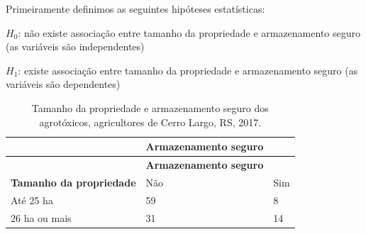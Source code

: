\documentclass[12pt,brazil,oneside]{book}
\begin{document}
Primeiramente definimos as seguintes hipóteses estatísticas:

\(H_0\): não existe associação entre tamanho da propriedade e armazenamento seguro (as variáveis são independentes)

\(H_1\): existe associação entre tamanho da propriedade e armazenamento seguro (as variáveis são dependentes)

\begin{longtable}[]{@{}lll@{}}
\caption{\label{tab:tamprop}Tamanho da propriedade e armazenamento seguro dos agrotóxicos, agricultores de Cerro Largo, RS, 2017.}\tabularnewline
\toprule
\begin{minipage}[b]{0.35\columnwidth}\raggedright
\strut
\end{minipage} & \begin{minipage}[b]{0.32\columnwidth}\raggedright
\textbf{Armazenamento seguro}\strut
\end{minipage} & \begin{minipage}[b]{0.16\columnwidth}\raggedright
\strut
\end{minipage}\tabularnewline
\midrule
\endfirsthead
\toprule
\begin{minipage}[b]{0.35\columnwidth}\raggedright
\strut
\end{minipage} & \begin{minipage}[b]{0.32\columnwidth}\raggedright
\textbf{Armazenamento seguro}\strut
\end{minipage} & \begin{minipage}[b]{0.16\columnwidth}\raggedright
\strut
\end{minipage}\tabularnewline
\midrule
\endhead
\begin{minipage}[t]{0.35\columnwidth}\raggedright
\textbf{Tamanho da propriedade}\strut
\end{minipage} & \begin{minipage}[t]{0.32\columnwidth}\raggedright
Não\strut
\end{minipage} & \begin{minipage}[t]{0.16\columnwidth}\raggedright
Sim\strut
\end{minipage}\tabularnewline
\begin{minipage}[t]{0.35\columnwidth}\raggedright
Até 25 ha\strut
\end{minipage} & \begin{minipage}[t]{0.32\columnwidth}\raggedright
59\strut
\end{minipage} & \begin{minipage}[t]{0.16\columnwidth}\raggedright
8\strut
\end{minipage}\tabularnewline
\begin{minipage}[t]{0.35\columnwidth}\raggedright
26 ha ou mais\strut
\end{minipage} & \begin{minipage}[t]{0.32\columnwidth}\raggedright
31\strut
\end{minipage} & \begin{minipage}[t]{0.16\columnwidth}\raggedright
14\strut
\end{minipage}\tabularnewline
\bottomrule
\end{longtable}
\end{document}
